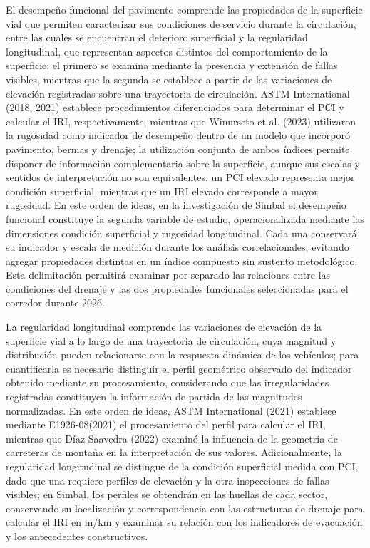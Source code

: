 El desempeño funcional del pavimento comprende las propiedades de la superficie vial que permiten caracterizar sus condiciones de servicio durante la circulación, entre las cuales se encuentran el deterioro superficial y la regularidad longitudinal, que representan aspectos distintos del comportamiento de la superficie: el primero se examina mediante la presencia y extensión de fallas visibles, mientras que la segunda se establece a partir de las variaciones de elevación registradas sobre una trayectoria de circulación. ASTM International (2018, 2021) establece procedimientos diferenciados para determinar el PCI y calcular el IRI, respectivamente, mientras que Winurseto et al. (2023) utilizaron la rugosidad como indicador de desempeño dentro de un modelo que incorporó pavimento, bermas y drenaje; la utilización conjunta de ambos índices permite disponer de información complementaria sobre la superficie, aunque sus escalas y sentidos de interpretación no son equivalentes: un PCI elevado representa mejor condición superficial, mientras que un IRI elevado corresponde a mayor rugosidad. En este orden de ideas, en la investigación de Simbal el desempeño funcional constituye la segunda variable de estudio, operacionalizada mediante las dimensiones condición superficial y rugosidad longitudinal. Cada una conservará su indicador y escala de medición durante los análisis correlacionales, evitando agregar propiedades distintas en un índice compuesto sin sustento metodológico. Esta delimitación permitirá examinar por separado las relaciones entre las condiciones del drenaje y las dos propiedades funcionales seleccionadas para el corredor durante 2026.


La regularidad longitudinal comprende las variaciones de elevación de la superficie vial a lo largo de una trayectoria de circulación, cuya magnitud y distribución pueden relacionarse con la respuesta dinámica de los vehículos; para cuantificarla es necesario distinguir el perfil geométrico observado del indicador obtenido mediante su procesamiento, considerando que las irregularidades registradas constituyen la información de partida de las magnitudes normalizadas. En este orden de ideas, ASTM International (2021) establece mediante E1926-08(2021) el procesamiento del perfil para calcular el IRI, mientras que Díaz Saavedra (2022) examinó la influencia de la geometría de carreteras de montaña en la interpretación de sus valores. Adicionalmente, la regularidad longitudinal se distingue de la condición superficial medida con PCI, dado que una requiere perfiles de elevación y la otra inspecciones de fallas visibles; en Simbal, los perfiles se obtendrán en las huellas de cada sector, conservando su localización y correspondencia con las estructuras de drenaje para calcular el IRI en m/km y examinar su relación con los indicadores de evacuación y los antecedentes constructivos.


